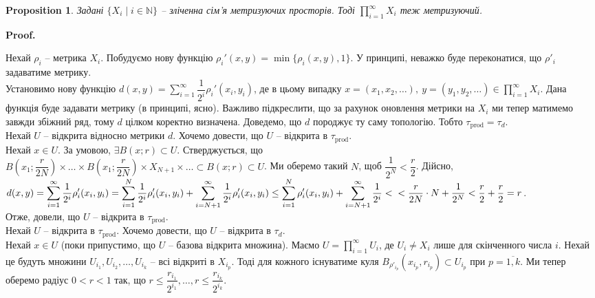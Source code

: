\documentclass[a4paper, 10pt]{article}
\makeatletter
\theoremstyle{theoremdd}
\newtheorem{proposition}[theorem]{Proposition}
\renewenvironment{proof}[1][Proof.\\]{\par
\pushQED{\hfill \qed}%
\normalfont \topsep6\p@\@plus6\p@\relax
\trivlist
\item\relax
{\bfseries
#1\@addpunct{.}}\hspace\labelsep\ignorespaces
}{%
\popQED\endtrivlist\@endpefalse
}
\makeatother
\begin{document}
\begin{proposition}
Задані $\{X_i \mid i \in \mathbb{N}\}$ -- зліченна сім'я метризуючих просторів. Тоді $\displaystyle\prod_{i=1}^\infty X_i$ теж метризуючий.
\end{proposition}

\begin{proof}
Нехай $\rho_i$ -- метрика $X_i$. Побудуємо нову функцію $\rho_i'(x,y) = \displaystyle\min\{\rho_i(x,y), 1\}$.
 У принципі, неважко буде переконатися, що $\rho'_i$ задаватиме метрику.\\
Установимо нову функцію $d(x,y) = \displaystyle\sum_{i=1}^\infty \dfrac{1}{2^i} \rho_i'(x_i,y_i)$, де в цьому випадку $x = (x_1,x_2,\dots),\ y = (y_1,y_2,\dots) \in \displaystyle\prod_{i=1}^\infty X_i$. Дана функція буде задавати метрику (в принципі, ясно). Важливо підкреслити, що за рахунок оновлення метрики на $X_i$ ми тепер матимемо завжди збіжний ряд, тому $d$ цілком коректно визначена. Доведемо, що $d$ породжує ту саму топологію. Тобто $\tau_{\text{prod}} = \tau_d$.\\
Нехай $U$ -- відкрита відносно метрики $d$. Хочемо довести, що $U$ -- відкрита в $\tau_{\text{prod}}$.\\
Нехай $x \in U$. За умовою, $\exists B(x;r) \subset U$. Стверджується, що \\ $B\left(x_1;\dfrac{r}{2N}\right) \times \dots \times B\left(x_1;\dfrac{r}{2N}\right) \times X_{N+1} \times \dots \subset B(x;r) \subset U$. Ми оберемо такий $N$, щоб $\dfrac{1}{2^N} < \dfrac{r}{2}$. Дійсно, \\
$d(x,y) = \displaystyle\sum_{i=1}^\infty \dfrac{1}{2^i} \rho_i'(x_i,y_i) = \sum_{i=1}^N \dfrac{1}{2^i} \rho_i'(x_i,y_i) + \sum_{i=N+1}^\infty \dfrac{1}{2^i} \rho_i'(x_i,y_i) \leq \sum_{i=1}^N \rho_i'(x_i,y_i) + \sum_{i=N+1}^\infty \dfrac{1}{2^i} <\\
< \dfrac{r}{2N} \cdot N + \dfrac{1}{2^{N}} < \dfrac{r}{2} + \dfrac{r}{2} = r$.\\
Отже, довели, що $U$ -- відкрита в $\tau_{\text{prod}}$.\\
Нехай $U$ -- відкрита в $\tau_{\text{prod}}$. Хочемо довести, що $U$ -- відкрита в $\tau_{d}$.\\
Нехай $x \in U$ (поки припустимо, що $U$ -- базова відкрита множина). Маємо $U = \displaystyle\prod_{i=1}^\infty U_i$, де $U_i \neq X_i$ лише для скінченного числа $i$. Нехай це будуть множини $U_{i_1},U_{i_2},\dots,U_{i_k}$ -- всі відкриті в $X_{i_p}$. Тоді для кожного існуватиме куля $B_{\rho'_{i_p}}(x_{i_p},r_{i_p}) \subset U_{i_p}$ при $p = \overline{1,k}$. Ми тепер оберемо радіус $0 < r < 1$ так, що $r \leq \dfrac{r_{i_1}}{2^{i_1}},\dots, r \leq \dfrac{r_{i_k}}{2^{i_k}}$.\\

\end{proof}
\end{document}
